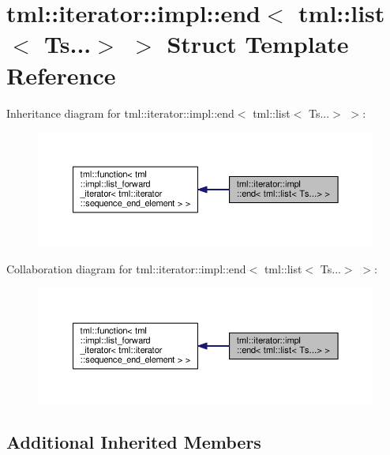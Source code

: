 \hypertarget{structtml_1_1iterator_1_1impl_1_1end_3_01tml_1_1list_3_01_ts_8_8_8_4_01_4}{\section{tml\+:\+:iterator\+:\+:impl\+:\+:end$<$ tml\+:\+:list$<$ Ts...$>$ $>$ Struct Template Reference}
\label{structtml_1_1iterator_1_1impl_1_1end_3_01tml_1_1list_3_01_ts_8_8_8_4_01_4}
}


Inheritance diagram for tml\+:\+:iterator\+:\+:impl\+:\+:end$<$ tml\+:\+:list$<$ Ts...$>$ $>$\+:
\nopagebreak
\begin{figure}[H]
\begin{center}
\leavevmode
\includegraphics[width=350pt]{structtml_1_1iterator_1_1impl_1_1end_3_01tml_1_1list_3_01_ts_8_8_8_4_01_4__inherit__graph}
\end{center}
\end{figure}


Collaboration diagram for tml\+:\+:iterator\+:\+:impl\+:\+:end$<$ tml\+:\+:list$<$ Ts...$>$ $>$\+:
\nopagebreak
\begin{figure}[H]
\begin{center}
\leavevmode
\includegraphics[width=350pt]{structtml_1_1iterator_1_1impl_1_1end_3_01tml_1_1list_3_01_ts_8_8_8_4_01_4__coll__graph}
\end{center}
\end{figure}
\subsection*{Additional Inherited Members}


